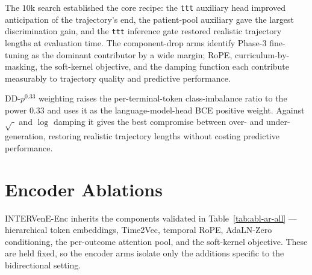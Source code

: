 The $10$k search established the core recipe: the \texttt{ttt} auxiliary head improved anticipation of the trajectory's end, the patient-pool auxiliary gave the largest discrimination gain, and the \texttt{ttt} inference gate restored realistic trajectory lengths at evaluation time. The component-drop arms identify Phase-3 fine-tuning as the dominant contributor by a wide margin; RoPE, curriculum-by-masking, the soft-kernel objective, and the damping function each contribute measurably to trajectory quality and predictive performance.

DD-$p^{0.33}$ weighting raises the per-terminal-token class-imbalance ratio to the power $0.33$ and uses it as the language-model-head BCE positive weight. Against $\sqrt{\cdot}$ and $\log$ damping it gives the best compromise between over- and under-generation, restoring realistic trajectory lengths without costing predictive performance.

\section{Encoder Ablations}
\label{app:abl-enc}

INTERVenE-Enc inherits the components validated in Table~\ref{tab:abl-ar-all} --- hierarchical token embeddings, Time2Vec, temporal RoPE, AdaLN-Zero conditioning, the per-outcome attention pool, and the soft-kernel objective. These are held fixed, so the encoder arms isolate only the additions specific to the bidirectional setting.

